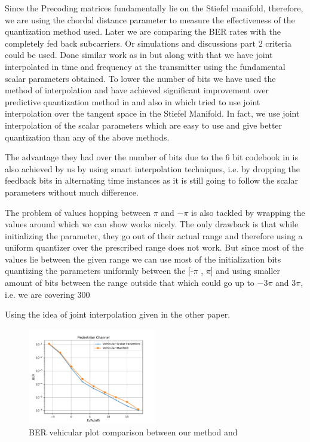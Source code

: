 \documentclass[conference]{IEEEtran}
\begin{document}
\label{setting}



\noindent Since the Precoding matrices fundamentally lie on the Stiefel manifold, therefore, we are using the chordal distance parameter to measure the effectiveness of the quantization method used. Later we are comparing the BER rates with the completely fed back subcarriers. Or simulations and discussions part 2 criteria could be used. Done similar work as in \cite{4114278} but along with that we have joint interpolated in time and frequency at the transmitter using the fundamental scalar parameters obtained. To lower the number of bits we have used the method of interpolation and have achieved significant improvement over predictive quantization method in \cite{6891198} and also in \cite{Gupt1905:Predictive} which tried to use joint interpolation over the tangent space in the Stiefel Manifold. In fact, we use joint interpolation of the scalar parameters which are easy to use and give better quantization than any of the above methods.

The advantage they had over the number of bits due to the 6 bit codebook in \cite{6891198,Gupt1905:Predictive} is also achieved by us by using smart interpolation techniques, i.e. by dropping the feedback bits in alternating time instances as it is still going to follow the scalar parameters without much difference.

The problem of values hopping between $\pi$ and $-\pi$ is also tackled by wrapping the values around which we can show works nicely. The only drawback is that while initializing the parameter, they go out of their actual range and therefore using a uniform quantizer over the prescribed range does not work. But since most of the values lie between the given range we can use most of the initialization bits quantizing the parameters uniformly between the [-$\pi$ , $\pi$] and using smaller amount of bits between the range outside that which could go up to $-3\pi$ and $3\pi$, i.e. we are covering 300%

Using the idea of joint interpolation given in the other paper.

\begin{figure}
\includegraphics[width=0.5\textwidth]{images/vehicular_ber.pdf}
\caption{BER vehicular plot comparison between our method and \cite{Gupt1905:Predictive}}
\label{ber_overview}
\vspace{-5pt}
\end{figure}
\end{document}
